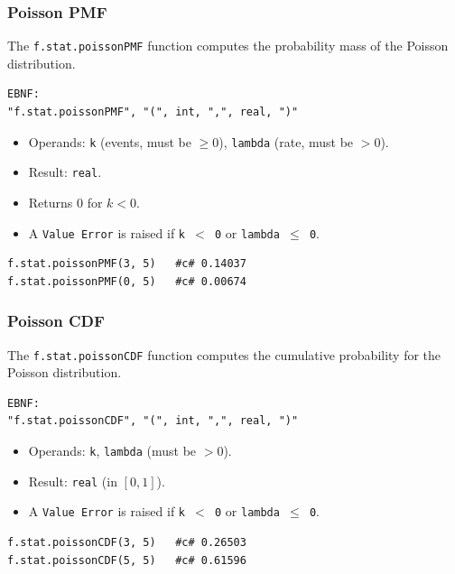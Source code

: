 \subsubsection{Poisson PMF}
The \texttt{f.stat.poissonPMF} function computes the probability mass of the Poisson distribution.
\begin{verbatim}
EBNF:
"f.stat.poissonPMF", "(", int, ",", real, ")"
\end{verbatim}
\begin{itemize}
\item Operands: \texttt{k} (events, must be $\geq 0$), \texttt{lambda} (rate, must be $> 0$).
\item Result: \texttt{real}.
\item Returns 0 for $k < 0$.
\item A \texttt{Value Error} is raised if \texttt{k $<$ 0} or \texttt{lambda $\leq$ 0}.
\end{itemize}
\begin{verbatim}
f.stat.poissonPMF(3, 5)   #c# 0.14037
f.stat.poissonPMF(0, 5)   #c# 0.00674
\end{verbatim}

\subsubsection{Poisson CDF}
The \texttt{f.stat.poissonCDF} function computes the cumulative probability for the Poisson distribution.
\begin{verbatim}
EBNF:
"f.stat.poissonCDF", "(", int, ",", real, ")"
\end{verbatim}
\begin{itemize}
\item Operands: \texttt{k}, \texttt{lambda} (must be $> 0$).
\item Result: \texttt{real} (in $[0, 1]$).
\item A \texttt{Value Error} is raised if \texttt{k $<$ 0} or \texttt{lambda $\leq$ 0}.
\end{itemize}
\begin{verbatim}
f.stat.poissonCDF(3, 5)   #c# 0.26503
f.stat.poissonCDF(5, 5)   #c# 0.61596
\end{verbatim}

